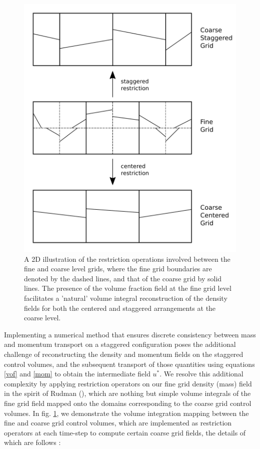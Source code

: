 \begin{figure}[h!]
    \centering
    \includegraphics[width = \textwidth]{plots/restriction.png}
    \caption{A 2D illustration of the restriction operations involved between the fine and coarse level grids, where the fine grid boundaries are denoted by the dashed lines, and that of the coarse grid by solid lines. The presence of the volume fraction field at the fine grid level facilitates a 'natural' volume integral reconstruction of the density fields for both the centered and staggered arrangements at the coarse level.} 
    \label{restrict}
\end{figure}

Implementing a numerical method that ensures discrete consistency between mass and momentum transport on a staggered configuration poses the additional challenge of reconstructing the density and momentum fields on the staggered control volumes, and the subsequent transport of those quantities using equations \ref{vof} and \ref{mom} to obtain the intermediate field $u^{*}$. We resolve this additional complexity by applying restriction operators on our fine grid density (mass) field in the spirit of Rudman (\cite{rudman1998volume}), which are nothing but simple volume integrals of the fine grid field mapped onto the domains corresponding to the coarse grid control volumes. In fig. \ref{restrict}, we demonstrate the volume integration mapping between the fine and coarse grid control volumes, which are implemented as restriction operators at each time-step to compute certain coarse grid fields, the details of which are follows : 


